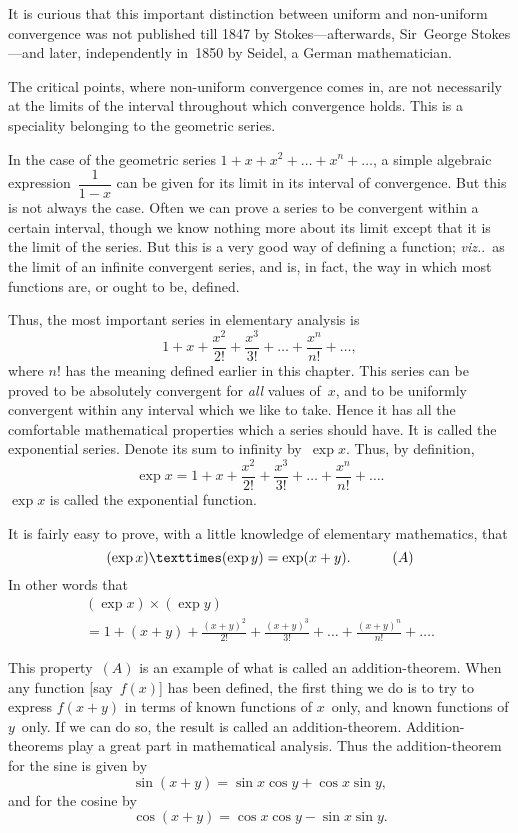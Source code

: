 \documentclass[12pt,leqno]{book}[2005/09/16]
\newcommand{\Chg}[2]{#2}
\newcommand{\Add}[1]{\Chg{}{#1}}
\newcommand{\PageSep}[1]{\ignorespaces}
\newcommand{\viz}{\emph{viz.}}
\newcommand{\Tag}[1]{\tag*{\quad\ensuremath{#1}}}
\newcommand{\Eq}[1]{\ensuremath{#1}}
\begin{document}
It is curious that this important distinction
between uniform and non-uniform convergence
was not published till 1847 by Stokes---afterwards,
%
Sir~George Stokes---and later, independently
in~1850 by Seidel, a German
%
mathematician.

The critical points, where non-uniform convergence
comes in, are not necessarily at the
limits of the interval throughout which convergence
holds. This is a speciality belonging
to the geometric series.

In the case of the geometric series $1 + x + x^{2} + \dots + x^{n} + \dots$,
a simple algebraic
expression~$\dfrac{1}{1 - x}$ can be given for its limit in
its interval of convergence. But this is not
always the case. Often we can prove a series
to be convergent within a certain interval,
though we know nothing more about its
limit except that it is the limit of the series.
\PageSep{211}
But this is a very good way of defining a
function; \viz.\ as the limit of an infinite convergent
series, and is, in fact, the way in which
most functions are, or ought to be, defined.

Thus, the most important series in elementary
%
analysis is
\[
1 + x + \frac{x^{2}}{2!} + \frac{x^{3}}{3!} + \dots + \frac{x^{n}}{n!} + \dots,
\]
where $n!$ has the meaning defined earlier in
this chapter. This series can be proved to
be absolutely convergent for \emph{all} values of~$x$,
and to be uniformly convergent within any
interval which we like to take. Hence it has
all the comfortable mathematical properties
which a series should have. It is called the
exponential series. Denote its sum to infinity
by~$\exp x$. Thus, by definition,
\[
\exp x = 1 + x + \frac{x^{2}}{2!} + \frac{x^{3}}{3!} + \dots
  + \frac{x^{n}}{n!} + \dots\Add{.}
\]
$\exp x$ is called the exponential function.

It is fairly easy to prove, with a little
knowledge of elementary mathematics, that
\[
(\exp x) × (\exp y) = \exp(x + y).
\Tag{(A)}
\]
In other words that
\begin{multline*}
(\exp x) × (\exp y) \\
  = 1 + (x + y) + \frac{(x + y)^{2}}{2!} + \frac{(x + y)^{3}}{3!} + \dots
  + \frac{(x + y)^{n}}{n!} + \dots\Add{.}
\end{multline*}
\PageSep{212}

This property~\Eq{(A)} is an example of what
is called an addition-theorem. When any
%
function [say~$f(x)$] has been defined, the first
thing we do is to try to express $f(x + y)$ in terms
of known functions of $x$~only, and known functions
of $y$~only. If we can do so, the result
is called an addition-theorem. Addition-theorems
play a great part in mathematical
analysis. Thus the addition-theorem for the
sine is given by
\[
\sin(x + y) = \sin x \cos y + \cos x \sin y,
\]
and for the cosine by
\[
\cos(x + y) = \cos x \cos y - \sin x \sin y.
\]
\end{document}
